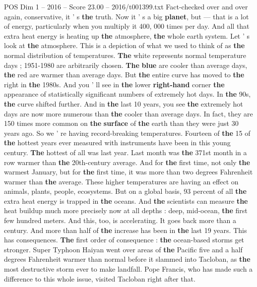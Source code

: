 \begin{textsample}{POS Dim 1 – 2016 – Score 23.00 – 2016/t001399.txt}
Fact-checked over and over again, conservative, it ' s \textbf{the} truth.
Now it ' s a big \textbf{planet}, but — that is a lot of energy, particularly when you multiply it 400, 000 times per day.
And all that extra heat energy is heating up \textbf{the} atmosphere, \textbf{the} whole earth system.
Let ' s look at \textbf{the} atmosphere.
This is a depiction of what we used to think of as \textbf{the} normal distribution of temperatures. \textbf{The} white represents normal temperature days ; 1951-1980 are arbitrarily chosen. \textbf{The} \textbf{blue} are cooler than average days, \textbf{the} red are warmer than average days.
But \textbf{the} entire curve has moved to \textbf{the} right in \textbf{the} 1980s.
And you ' ll see in \textbf{the} lower \textbf{right-hand} corner \textbf{the} appearance of statistically significant numbers of extremely hot days.
In \textbf{the} 90s, \textbf{the} curve shifted further.
And in \textbf{the} last 10 years, you see \textbf{the} extremely hot days are now more numerous than \textbf{the} cooler than average days.
In fact, they are 150 times more common on \textbf{the} \textbf{surface} of \textbf{the} earth than they were just 30 years ago.
So we ' re having record-breaking temperatures.
Fourteen of \textbf{the} 15 of \textbf{the} hottest years ever measured with instruments have been in this young century. \textbf{The} hottest of all was last year.
Last month was \textbf{the} 371st month in a row warmer than \textbf{the} 20th-century average.
And for \textbf{the} first time, not only \textbf{the} warmest January, but for \textbf{the} first time, it was more than two degrees Fahrenheit warmer than \textbf{the} average.
These higher temperatures are having an effect on animals, plants, people, ecosystems.
But on a global basis, 93 percent of all \textbf{the} extra heat energy is trapped in \textbf{the} oceans.
And \textbf{the} scientists can measure \textbf{the} heat buildup much more precisely now at all depths : deep, mid-ocean, \textbf{the} first few hundred meters.
And this, too, is accelerating.
It goes back more than a century.
And more than half of \textbf{the} increase has been in \textbf{the} last 19 years.
This has consequences. \textbf{The} first order of consequence : \textbf{the} ocean-based storms get stronger.
Super Typhoon Haiyan went over areas of \textbf{the} Pacific five and a half degrees Fahrenheit warmer than normal before it slammed into Tacloban, as \textbf{the} most destructive storm ever to make landfall.
Pope Francis, who has made such a difference to this whole issue, visited Tacloban right after that.

\end{textsample}
